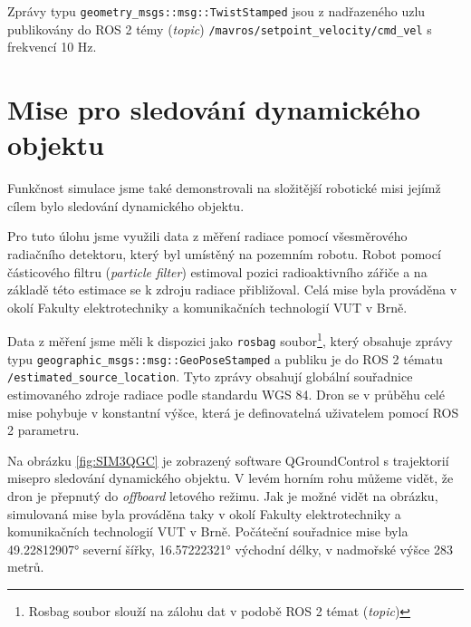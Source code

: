 Zprávy typu \texttt{geometry\_msgs::msg::TwistStamped} jsou z nadřazeného uzlu publikovány do ROS 2 témy (\textit{topic}) \texttt{/mavros/setpoint\_velocity/cmd\_vel} s frekvencí 10 Hz.

\section{Mise pro sledování dynamického objektu}

Funkčnost simulace jsme také demonstrovali na složitější robotické misi jejímž cílem bylo sledování dynamického objektu. 

Pro tuto úlohu jsme využili data z měření radiace pomocí všesměrového radiačního detektoru, který byl umístěný na pozemním robotu. Robot pomocí částicového filtru (\textit{particle filter}) estimoval pozici radioaktivního zářiče a na základě této estimace se k zdroju radiace přibližoval. Celá mise byla prováděna v okolí Fakulty elektrotechniky a komunikačních technologií VUT v Brně.

Data z měření jsme měli k dispozici jako \texttt{rosbag} soubor\footnote{Rosbag soubor slouží na zálohu dat v podobě ROS 2 témat (\textit{topic})}, který obsahuje zprávy typu \texttt{geographic\_msgs::msg::GeoPoseStamped} a publiku je do ROS 2 tématu \texttt{/estimated\_source\_location}. Tyto zprávy obsahují globální souřadnice estimovaného zdroje radiace podle standardu WGS 84. Dron se v průběhu celé mise pohybuje v konstantní výšce, která je definovatelná uživatelem pomocí ROS 2 parametru.

Na obrázku \ref{fig:SIM3QGC} je zobrazený software QGroundControl s trajektorií mise\break pro sledování dynamického objektu. V levém horním rohu můžeme vidět, že dron je přepnutý do \textit{offboard} letového režimu. Jak je možné vidět na obrázku, simulovaná mise byla prováděna taky v okolí Fakulty elektrotechniky a komunikačních technologií VUT v Brně. Počáteční souřadnice mise byla 49.22812907° severní šířky, 16.57222321° východní délky, v nadmořské výšce 283 metrů.

